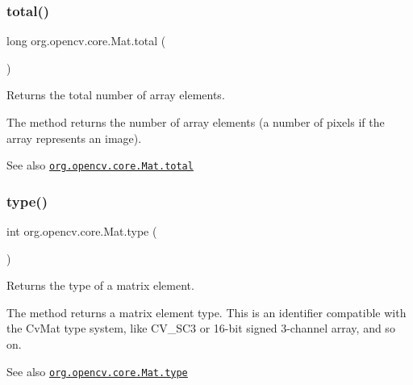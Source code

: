 \subsubsection{\texorpdfstring{total()}{total()}}
{\footnotesize\ttfamily long org.\+opencv.\+core.\+Mat.\+total (\begin{DoxyParamCaption}{ }\end{DoxyParamCaption})}

Returns the total number of array elements.

The method returns the number of array elements (a number of pixels if the array represents an image).

\begin{DoxySeeAlso}{See also}
\href{http://docs.opencv.org/modules/core/doc/basic_structures.html#mat-total}{\tt org.\+opencv.\+core.\+Mat.\+total} 
\end{DoxySeeAlso}
\mbox{\label{classorg_1_1opencv_1_1core_1_1_mat_a555bc7243135e2883afe54e7e5e92c79}} 
\subsubsection{\texorpdfstring{type()}{type()}}
{\footnotesize\ttfamily int org.\+opencv.\+core.\+Mat.\+type (\begin{DoxyParamCaption}{ }\end{DoxyParamCaption})}

Returns the type of a matrix element.

The method returns a matrix element type. This is an identifier compatible with the {\ttfamily Cv\+Mat} type system, like {\ttfamily C\+V\+\_\+S\+C3} or 16-\/bit signed 3-\/channel array, and so on.

\begin{DoxySeeAlso}{See also}
\href{http://docs.opencv.org/modules/core/doc/basic_structures.html#mat-type}{\tt org.\+opencv.\+core.\+Mat.\+type} 
\end{DoxySeeAlso}
\mbox{\label{classorg_1_1opencv_1_1core_1_1_mat_a865879f055007ff347401280a4fd9b73}} 
